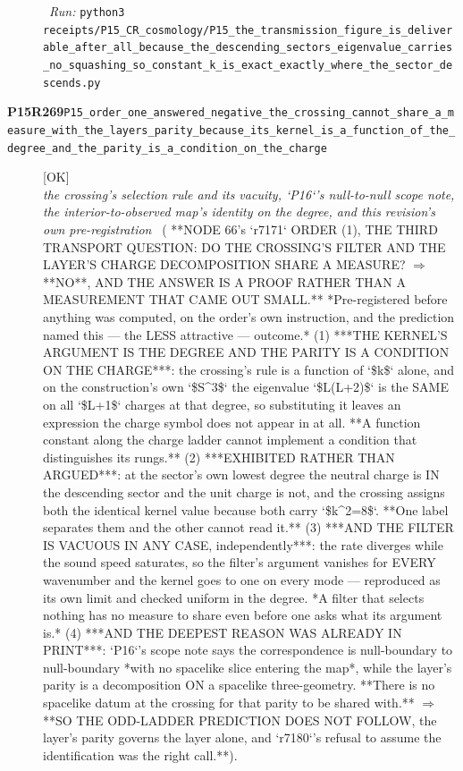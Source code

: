 \begin{description}
\ \emph{Run:} \texttt{python3 receipts/P15\_CR\_cosmology/P15\_the\_transmission\_figure\_is\_deliverable\_after\_all\_because\_the\_descending\_sectors\_eigenvalue\_carries\_no\_squashing\_so\_constant\_k\_is\_exact\_exactly\_where\_the\_sector\_descends.py}
\item[\rcptlabel{P15_order_one_answered_negative_the_crossing_cannot_share_a_measure_with_the_layers_parity_because_its_kernel_is_a_function_of_the_degree_and_the_parity_is_a_condition_on_the_charge}{P15R269}\textbf{P15R269}\quad\texttt{P15\_order\_one\_answered\_negative\_the\_crossing\_cannot\_share\_a\_measure\_with\_the\_layers\_parity\_because\_its\_kernel\_is\_a\_function\_of\_the\_degree\_and\_the\_parity\_is\_a\_condition\_on\_the\_charge}]\hfill\textsf{[OK]}\\
\textit{the crossing's selection rule and its vacuity, `P16`'s null-to-null scope note, the interior-to-observed map's identity on the degree, and this revision's own pre-registration} \ ( **NODE 66's `r7171` ORDER (1), THE THIRD TRANSPORT QUESTION: DO THE CROSSING'S FILTER AND THE LAYER'S CHARGE DECOMPOSITION SHARE A MEASURE? \ensuremath{\Rightarrow} **NO**, AND THE ANSWER IS A PROOF RATHER THAN A MEASUREMENT THAT CAME OUT SMALL.**  *Pre-registered before anything was computed, on the order's own instruction, and the prediction named this --- the LESS attractive --- outcome.* (1) ***THE KERNEL'S ARGUMENT IS THE DEGREE AND THE PARITY IS A CONDITION ON THE CHARGE***: the crossing's rule is a function of `\$k\$` alone, and on the construction's own `\$S\textasciicircum{}3\$` the eigenvalue `\$L(L+2)\$` is the SAME on all `\$L+1\$` charges at that degree, so substituting it leaves an expression the charge symbol does not appear in at all. **A function constant along the charge ladder cannot implement a condition that distinguishes its rungs.** (2) ***EXHIBITED RATHER THAN ARGUED***: at the sector's own lowest degree the neutral charge is IN the descending sector and the unit charge is not, and the crossing assigns both the identical kernel value because both carry `\$k\textasciicircum{}2=8\$`. **One label separates them and the other cannot read it.** (3) ***AND THE FILTER IS VACUOUS IN ANY CASE, independently***: the rate diverges while the sound speed saturates, so the filter's argument vanishes for EVERY wavenumber and the kernel goes to one on every mode --- reproduced as its own limit and checked uniform in the degree. *A filter that selects nothing has no measure to share even before one asks what its argument is.* (4) ***AND THE DEEPEST REASON WAS ALREADY IN PRINT***: `P16`'s scope note says the correspondence is null-boundary to null-boundary *with no spacelike slice entering the map*, while the layer's parity is a decomposition ON a spacelike three-geometry. **There is no spacelike datum at the crossing for that parity to be shared with.** \ensuremath{\Rightarrow} **SO THE ODD-LADDER PREDICTION DOES NOT FOLLOW, the layer's parity governs the layer alone, and `r7180`'s refusal to assume the identification was the right call.**). 

\end{description}
